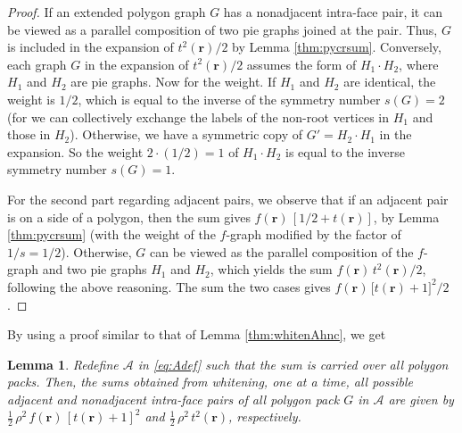 \documentclass[aip,jcp,reprint,superscriptaddress]{revtex4-1}
\newtheorem{lemm}[thrm]{Lemma}
\newcommand{\vct}[1]{\mathbf{#1}}
\providecommand{\vr}{} %
\renewcommand{\vr}{\vct{r}}
\newcommand{\A}{\mathcal{A}}
\begin{document}
\begin{proof}
If an extended polygon graph $G$ has a nonadjacent intra-face pair,
  it can be viewed as a parallel composition
  of two pie graphs joined at the pair.
%
Thus, $G$ is included in the expansion of $t^2(\vr)/2$
  by Lemma \ref{thm:pycrsum}.
%
Conversely,
  each graph $G$ in the expansion of $t^2(\vr)/2$
  assumes the form of $H_1 \cdot H_2$,
  where $H_1$ and $H_2$ are pie graphs.
%
Now for the weight.
%
If $H_1$ and $H_2$ are identical,
  the weight is $1/2$,
  which is equal to the inverse of
  the symmetry number $s(G) = 2$
  (for we can collectively exchange
  the labels of the non-root vertices in $H_1$
  and those in $H_2$).
%
Otherwise,
  we have a symmetric copy of $G' = H_2 \cdot H_1$
  in the expansion.
So the weight $2\cdot(1/2) = 1$ of $H_1 \cdot H_2$
  is equal to the inverse symmetry number $s(G) = 1$.

For the second part regarding adjacent pairs,
  we observe that
  if an adjacent pair is on a side of a polygon,
  then the sum gives $f(\vr) \, [1/2 + t(\vr)]$,
  by Lemma \ref{thm:pycrsum}
  (with the weight of the $f$-graph
  modified by the factor of $1/s = 1/2$).
%
Otherwise,
  $G$ can be viewed as the parallel composition
  of the $f$-graph and two pie graphs $H_1$ and $H_2$,
%
which yields the sum $f(\vr) \, t^2(\vr)/2$,
  following the above reasoning.
%
The sum the two cases gives
  $f(\vr) \, \bigl[ t(\vr) + 1 \bigr]^2/2$.
\end{proof}



By using a proof similar to that of
Lemma \ref{thm:whitenAhnc},
we get

\begin{lemm}
Redefine $\A$ in \eqref{eq:Adef}
such that the sum is carried over all polygon packs.
Then, the sums obtained from whitening,
one at a time,
all possible
adjacent and nonadjacent intra-face pairs
of all polygon pack $G$ in $\A$
are given by
$\frac{1}{2} \, \rho^2 \, f(\vr) \, [t(\vr) + 1]^2$
and
$\frac{1}{2} \, \rho^2 \, t^2(\vr)$,
respectively.
\label{thm:whitenApy}
\end{lemm}
\end{document}
